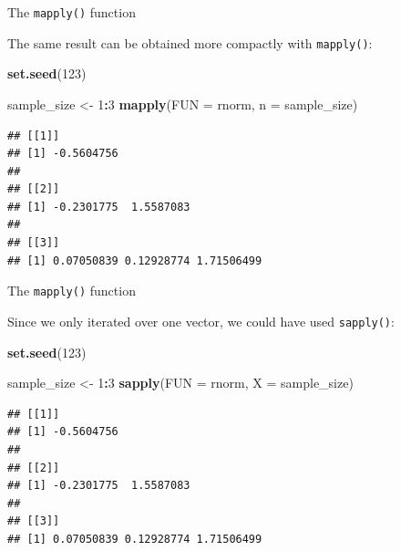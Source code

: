 \documentclass[ignorenonframetext,]{beamer}
\newenvironment{Shaded}{\begin{snugshade}}{\end{snugshade}}
\newcommand{\DataTypeTok}[1]{\textcolor[rgb]{0.13,0.29,0.53}{#1}}
\newcommand{\DecValTok}[1]{\textcolor[rgb]{0.00,0.00,0.81}{#1}}
\newcommand{\KeywordTok}[1]{\textcolor[rgb]{0.13,0.29,0.53}{\textbf{#1}}}
\newcommand{\NormalTok}[1]{#1}
\newcommand{\OperatorTok}[1]{\textcolor[rgb]{0.81,0.36,0.00}{\textbf{#1}}}
\newcommand{\StringTok}[1]{\textcolor[rgb]{0.31,0.60,0.02}{#1}}
\begin{document}
\begin{frame}[fragile]{The \texttt{mapply()} function}
\protect\hypertarget{the-mapply-function-2}{}

The same result can be obtained more compactly with \texttt{mapply()}:

\begin{Shaded}
\begin{Highlighting}[]
\KeywordTok{set.seed}\NormalTok{(}\DecValTok{123}\NormalTok{)}

\NormalTok{sample_size <-}\StringTok{ }\DecValTok{1}\OperatorTok{:}\DecValTok{3}
\KeywordTok{mapply}\NormalTok{(}\DataTypeTok{FUN =}\NormalTok{ rnorm, }\DataTypeTok{n =}\NormalTok{ sample_size)}
\end{Highlighting}
\end{Shaded}

\begin{verbatim}
## [[1]]
## [1] -0.5604756
## 
## [[2]]
## [1] -0.2301775  1.5587083
## 
## [[3]]
## [1] 0.07050839 0.12928774 1.71506499
\end{verbatim}

\end{frame}

\begin{frame}[fragile]{The \texttt{mapply()} function}
\protect\hypertarget{the-mapply-function-3}{}

Since we only iterated over one vector, we could have used
\texttt{sapply()}:

\begin{Shaded}
\begin{Highlighting}[]
\KeywordTok{set.seed}\NormalTok{(}\DecValTok{123}\NormalTok{)}

\NormalTok{sample_size <-}\StringTok{ }\DecValTok{1}\OperatorTok{:}\DecValTok{3}
\KeywordTok{sapply}\NormalTok{(}\DataTypeTok{FUN =}\NormalTok{ rnorm, }\DataTypeTok{X =}\NormalTok{ sample_size)}
\end{Highlighting}
\end{Shaded}

\begin{verbatim}
## [[1]]
## [1] -0.5604756
## 
## [[2]]
## [1] -0.2301775  1.5587083
## 
## [[3]]
## [1] 0.07050839 0.12928774 1.71506499
\end{verbatim}

\end{frame}
\end{document}
